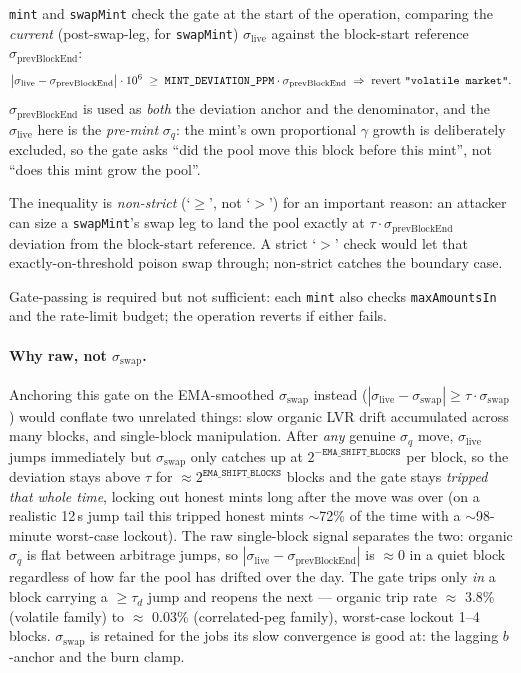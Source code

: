 \documentclass[11pt]{article}
\begin{document}
\texttt{mint} and \texttt{swapMint} check the gate at the start of the
operation, comparing the \emph{current} (post-swap-leg, for
\texttt{swapMint}) $\sigma_{\mathrm{live}}$ against the block-start
reference $\sigma_{\mathrm{prevBlockEnd}}$:
\[
  \big|\sigma_{\mathrm{live}} - \sigma_{\mathrm{prevBlockEnd}}\big| \cdot 10^6
  \;\ge\;
  \texttt{MINT\_DEVIATION\_PPM} \cdot \sigma_{\mathrm{prevBlockEnd}}
  \;\Rightarrow\;
  \text{revert \texttt{"volatile market"}.}
\]
$\sigma_{\mathrm{prevBlockEnd}}$ is used as \emph{both} the deviation
anchor and the denominator, and the $\sigma_{\mathrm{live}}$ here is the
\emph{pre-mint} $\sigma_q$: the mint's own proportional $\gamma$ growth
is deliberately excluded, so the gate asks ``did the pool move this
block before this mint'', not ``does this mint grow the pool''.

The inequality is \emph{non-strict} (`$\ge$', not `$>$') for an
important reason: an attacker can size a \texttt{swapMint}'s swap leg
to land the pool exactly at $\tau \cdot \sigma_{\mathrm{prevBlockEnd}}$
deviation from the block-start reference. A strict `$>$' check would
let that exactly-on-threshold poison swap through; non-strict catches
the boundary case.

Gate-passing is required but not sufficient: each \texttt{mint} also
checks \texttt{maxAmountsIn} and the rate-limit budget; the operation
reverts if either fails.

\paragraph{Why raw, not $\sigma_{\mathrm{swap}}$.}
Anchoring this gate on the EMA-smoothed $\sigma_{\mathrm{swap}}$ instead
($|\sigma_{\mathrm{live}} - \sigma_{\mathrm{swap}}| \ge \tau \cdot
\sigma_{\mathrm{swap}}$) would conflate two unrelated things: slow
organic LVR drift accumulated across many blocks, and single-block
manipulation. After \emph{any}
genuine $\sigma_q$ move, $\sigma_{\mathrm{live}}$ jumps immediately but
$\sigma_{\mathrm{swap}}$ only catches up at $2^{-\texttt{EMA\_SHIFT\_BLOCKS}}$
per block, so the deviation stays above $\tau$ for $\approx
2^{\texttt{EMA\_SHIFT\_BLOCKS}}$ blocks and the gate stays
\emph{tripped that whole time}, locking out honest mints long after the
move was over (on a realistic 12\,s jump tail this tripped honest mints
$\sim$72\% of the time with a $\sim$98-minute worst-case lockout). The
raw single-block signal separates the two: organic $\sigma_q$ is flat
between arbitrage jumps, so $|\sigma_{\mathrm{live}} -
\sigma_{\mathrm{prevBlockEnd}}|$ is $\approx 0$ in a quiet block
regardless of how far the pool has drifted over the day. The gate
trips only \emph{in} a block carrying a $\ge \tau_d$ jump and reopens
the next --- organic trip rate $\approx$ 3.8\% (volatile family) to
$\approx$ 0.03\% (correlated-peg family), worst-case lockout 1--4
blocks. $\sigma_{\mathrm{swap}}$ is retained for the jobs its slow
convergence is good at: the lagging $b$-anchor and the burn clamp.
\end{document}

